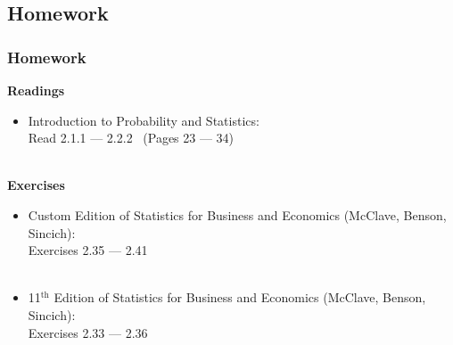 \documentclass[xcolor=svgnames, compress]{beamer}
\begin{document}
\subsection*{Homework}

\begin{frame}
\frametitle{Homework}

\vspace{-0.5cm}

\textbf{Readings}

\begin{itemize}\justifying
\item	Introduction to Probability and Statistics:\\
	\quad Read 2.1.1 --- 2.2.2 ~(Pages 23 --- 34)
\end{itemize}

\hfill\\

\textbf{Exercises}

\begin{itemize}\justifying
\item	Custom Edition of Statistics for Business and Economics (McClave, Benson, Sincich):\\
	\quad Exercises 2.35 --- 2.41 \\
\hfill\\
\item	11$^{\text{th}}$ Edition of Statistics for Business and Economics (McClave, Benson, Sincich):\\
	\quad Exercises 2.33 --- 2.36	\\
\end{itemize}




\end{frame}
\end{document}
